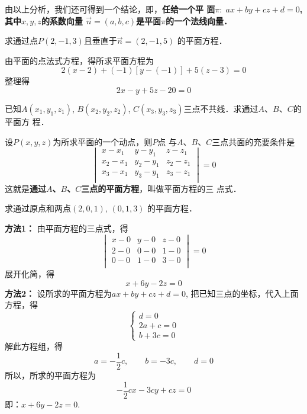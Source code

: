 由以上分析，我们还可得到一个结论，即，\textbf{任给一个平
面$\pi:\; ax+by+cz+d=0$, 其中$x,y,z$的系数向量  
$\vec{n}=(a,b,c)$是平面$\pi$的一个法线向量．
}

\begin{example}
    求通过点$P(2,-1,3)$且垂直于$\vec{n}=(2,-1,5)$
的平面方程．
\end{example}

\begin{solution}
    由平面的点法式方程，得所求平面方程为
\[2(x-2)+(-1)[y-(-1)]+5(z-3)=0\]
整理得
\[2x-y+5z-20=0\]
\end{solution}




\begin{example}
    已知$A(x_1,y_1,z_1)$, $B(x_2,y_2,z_2)$, 
$C(x_3,y_3,z_3)$三点不共线．求通过$A$、$B$、$C$的平面方
程．
\end{example}

\begin{solution}
    设$P(x,y,z)$为所求平面的一个动点，则$P$点
与$A$、$B$、$C$三点共面的充要条件是
\[\begin{vmatrix}
    x-x_1&y-y_1&z-z_1\\
    x_2-x_1&y_2-y_1&z_2-z_1\\
    x_3-x_1&y_3-y_1&z_3-z_1\\
\end{vmatrix}=0\]
这就是\textbf{通过$A$、$B$、$C$三点的平面方程}，叫做平面方程的三
点式．
\end{solution}




\begin{example}
    求通过原点和两点$(2,0,1)$, $(0,1,3)$
的平面方程．
\end{example}

\begin{solution}
\textbf{方法1：} 由平面方程的三点式，得
\[\begin{vmatrix}
x-0&y-0&z-0\\    
2-0&0-0&1-0\\ 
0-0&1-0&3-0\\ 
\end{vmatrix}=0\]
展开化简，得
\[x+6y-2z=0\]
\textbf{方法2：}
设所求的平面方程为$ax+by+cz+d=0$, 
把已知三点的坐标，代入上面方程，得
\[\begin{cases}
    d=0\\
    2a+c=0\\
    b+3c=0
\end{cases}\]
解此方程组，得
\[a=-\frac{1}{2}c,\qquad b=-3c,\qquad d=0\]
所以，所求的平面方程为
\[-\frac{1}{2}cx-3cy+cz=0\]
即：$x+6y-2z=0$.
\end{solution}

